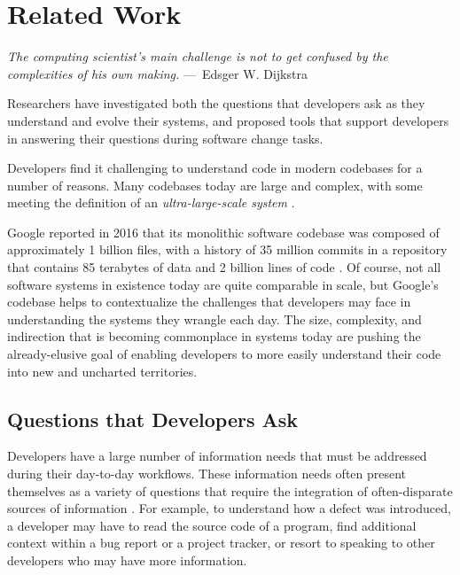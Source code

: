 
\chapter{Related Work}
\label{ch:RelatedWork}

\begin{epigraph}
    \emph{
       The computing scientist’s main challenge is not to get confused by the 
       complexities of his own making.
     } ---~Edsger W. Dijkstra
\end{epigraph}

\noindent Researchers have investigated both the questions that developers ask 
as they understand and evolve their systems, and proposed tools that support 
developers in answering their questions during software change tasks.

\par Developers find it challenging to understand code in modern codebases for
a number of reasons.
Many codebases today are large and complex, with some meeting the definition of 
an \emph{ultra-large-scale system} \cite{feiler-2006-ulss}.

\par Google reported in 2016 that its monolithic software codebase was composed
of approximately 1 billion files, with a history of 35 million commits in a
repository that contains 85 terabytes of data and 2 billion lines of code
\cite{potvin-2016-google}.
Of course, not all software systems in existence today are quite comparable in 
scale, but Google's codebase helps to contextualize the challenges that 
developers may face in understanding the systems they wrangle each day.
The size, complexity, and indirection that is becoming commonplace in systems
today \cite{latoza-2010-reach} are pushing the already-elusive goal of
enabling developers to more easily understand their code into new and 
uncharted territories.

\section{Questions that Developers Ask}
\label{sec:QuestionsThatDeveloperAsk}

\noindent Developers have a large number of information needs that must be
addressed during their day-to-day workflows.
These information needs often present themselves as a variety of questions
that require the integration of often-disparate sources of information
\cite{fritz-2010-info-frag}.
For example, to understand how a defect was introduced, a developer may have to
read the source code of a program, find additional context within a bug report
or a project tracker, or resort to speaking to other developers who may have 
more information. 

